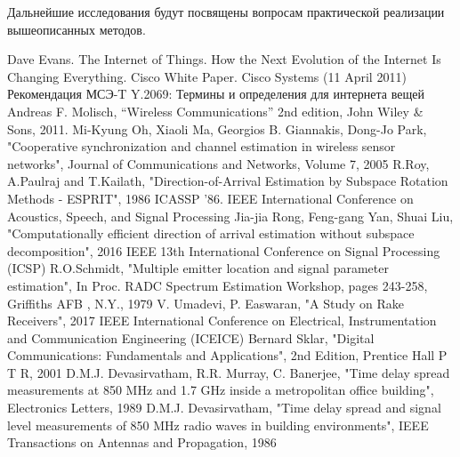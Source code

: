 \documentclass[a4paper,12pt,oneside]{scrartcl}
\begin{document}
Дальнейшие исследования будут посвящены вопросам практической реализации вышеописанных методов. 

\cleardoublepage
\begin{thebibliography}{99}
 Dave Evans. The Internet of Things. How the Next Evolution of the Internet Is Changing Everything. Cisco White Paper. Cisco Systems (11 April 2011)
 Рекомендация МСЭ-T Y.2069: Термины и определения для интернета вещей 
 Andreas F. Molisch, “Wireless Communications” 2nd edition, John Wiley \& Sons, 2011.
 Mi-Kyung Oh, Xiaoli Ma, Georgios B. Giannakis, Dong-Jo Park, "Cooperative synchronization and channel estimation in wireless sensor networks", Journal of Communications and Networks, Volume 7, 2005
 R.Roy, A.Paulraj and T.Kailath, "Direction-of-Arrival Estimation by Subspace Rotation Methods - ESPRIT", 1986 ICASSP '86. IEEE International Conference on Acoustics, Speech, and Signal Processing
 Jia-jia Rong, Feng-gang Yan, Shuai Liu, "Computationally efficient direction of arrival estimation without subspace decomposition", 2016 IEEE 13th International Conference on Signal Processing (ICSP)
 R.O.Schmidt, "Multiple emitter location and signal parameter estimation", In Proc. RADC Spectrum Estimation Workshop, pages 243-258, Griffiths AFB , N.Y., 1979
 V. Umadevi, P. Easwaran, "A Study on Rake Receivers",  2017 IEEE International Conference on Electrical, Instrumentation and Communication Engineering (ICEICE)
 Bernard Sklar, "Digital Communications: Fundamentals and Applications", 2nd Edition, Prentice Hall P T R, 2001
 D.M.J. Devasirvatham, R.R. Murray, C. Banerjee, "Time delay spread measurements at 850 MHz and 1.7 GHz inside a metropolitan office building", Electronics Letters, 1989
 D.M.J. Devasirvatham, "Time delay spread and signal level measurements of 850 MHz radio waves in building environments", IEEE Transactions on Antennas and Propagation, 1986
\end{thebibliography}

\cleardoublepage
\end{document}
